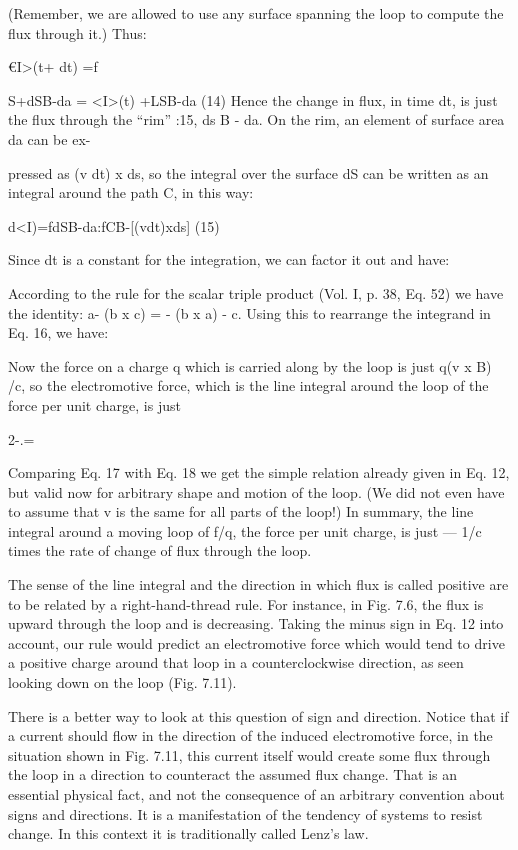 (Remember, we are allowed to use any surface spanning the loop to
compute the flux through it.) Thus:

€I>(t+ dt) =f

S+dSB-da = <I>(t) +LSB-da (14)
Hence the change in flux, in time dt, is just the flux through the ``rim''
:15, ds B - da. On the rim, an element of surface area da can be ex-

pressed as (v dt) x ds, so the integral over the surface dS can be
written as an integral around the path C, in this way:

d<I)=fdSB-da:fCB-[(vdt)xds] (15)

Since dt is a constant for the integration, we can factor it out and
have:


According to the rule for the scalar triple product (Vol. I, p. 38,
Eq. 52) we have the identity: a- (b x c) = - (b x a) - c. Using
this to rearrange the integrand in Eq. 16, we have:


 

  

Now the force on a charge q which is carried along by the loop is just
q(v x B) /c, so the electromotive force, which is the line integral
around the loop of the force per unit charge, is just

2-.=%

Comparing Eq. 17 with Eq. 18 we get the simple relation already
given in Eq. 12, but valid now for arbitrary shape and motion of the
loop. (We did not even have to assume that v is the same for all
parts of the loop!) In summary, the line integral around a moving
loop of f/q, the force per unit charge, is just --- 1/c times the rate of
change of flux through the loop.

The sense of the line integral and the direction in which flux is
called positive are to be related by a right-hand-thread rule. For
instance, in Fig. 7.6, the flux is upward through the loop and is
decreasing. Taking the minus sign in Eq. 12 into account, our rule
would predict an electromotive force which would tend to drive a
positive charge around that loop in a counterclockwise direction, as
seen looking down on the loop (Fig. 7.11).

There is a better way to look at this question of sign and direction.
Notice that if a current should flow in the direction of the induced
electromotive force, in the situation shown in Fig. 7.11, this current
itself would create some flux through the loop in a direction to
counteract the assumed flux change. That is an essential physical
fact, and not the consequence of an arbitrary convention about signs
and directions. It is a manifestation of the tendency of systems to
resist change. In this context it is traditionally called Lenz's law.

